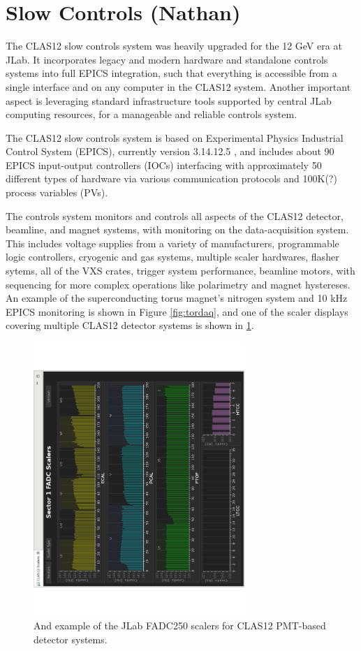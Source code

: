 \section{Slow Controls (Nathan)}

The CLAS12 slow controls system was heavily upgraded for the 12 GeV era at JLab.  It incorporates legacy and modern hardware and standalone controls systems into full EPICS integration, such that everything is accessible from a single interface and on any computer in the CLAS12 system.  Another important aspect is leveraging standard infrastructure tools supported by central JLab computing resources, for a manageable and reliable controls system.

The CLAS12 slow controls system is based on Experimental Physics Industrial Control System (EPICS), currently version 3.14.12.5 \cite{epics-website}, and includes about 90 EPICS input-output controllers (IOCs) interfacing with approximately 50 different types of hardware via various communication protocols and 100K(?) process variables (PVs).

The controls system monitors and controls all aspects of the CLAS12 detector, beamline, and magnet systems, with monitoring on the data-acquisition system.  This includes voltage supplies from a variety of manufacturers, programmable logic controllers, cryogenic and gas systems, multiple scaler hardwares, flasher sytems, all of the VXS crates, trigger system performance, beamline motors, with sequencing for more complex operations like polarimetry and magnet hystereses.  An example of the superconducting torus magnet's nitrogen system and 10 kHz EPICS monitoring is shown in Figure \ref{fig:tordaq}, and one of the scaler displays covering multiple CLAS12 detector systems is shown in \ref{fig:jlabscalers}.

\begin{figure}[htbp]\centering
\includegraphics[width=8cm]{img/fd-scalers}
\caption{And example of the JLab FADC250 scalers for CLAS12 PMT-based detector systems.\label{fig:jlabscalers}}
\end{figure}

